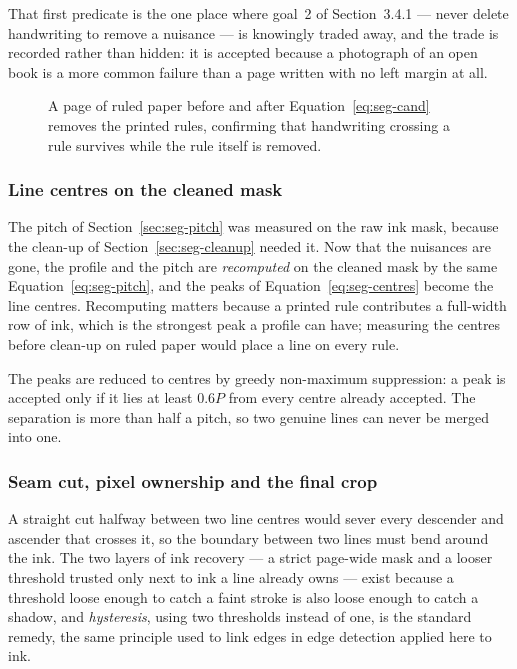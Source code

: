 That first predicate is the one place where goal~2 of Section~3.4.1 --- never delete handwriting to remove a nuisance --- is knowingly traded away, and the trade is recorded rather than hidden: it is accepted because a photograph of an open book is a more common failure than a page written with no left margin at all.

\begin{figure}[htb]
\centering
{}
\caption{A page of ruled paper before and after Equation~\ref{eq:seg-cand} removes the printed rules, confirming that handwriting crossing a rule survives while the rule itself is removed.}
\label{fig:seg-rules}
\end{figure}

\subsubsection{Line centres on the cleaned mask}
\label{sec:seg-centres}

The pitch of Section~\ref{sec:seg-pitch} was measured on the raw ink mask, because the clean-up of Section~\ref{sec:seg-cleanup} needed it. Now that the nuisances are gone, the profile and the pitch are \emph{recomputed} on the cleaned mask by the same Equation~\ref{eq:seg-pitch}, and the peaks of Equation~\ref{eq:seg-centres} become the line centres. Recomputing matters because a printed rule contributes a full-width row of ink, which is the strongest peak a profile can have; measuring the centres before clean-up on ruled paper would place a line on every rule.

The peaks are reduced to centres by greedy non-maximum suppression: a peak is accepted only if it lies at least $0.6P$ from every centre already accepted. The separation is more than half a pitch, so two genuine lines can never be merged into one.

\subsubsection{Seam cut, pixel ownership and the final crop}

A straight cut halfway between two line centres would sever every descender and ascender that crosses it, so the boundary between two lines must bend around the ink. The two layers of ink recovery --- a strict page-wide mask and a looser threshold trusted only next to ink a line already owns --- exist because a threshold loose enough to catch a faint stroke is also loose enough to catch a shadow, and \emph{hysteresis}, using two thresholds instead of one, is the standard remedy, the same principle used to link edges in edge detection applied here to ink.

